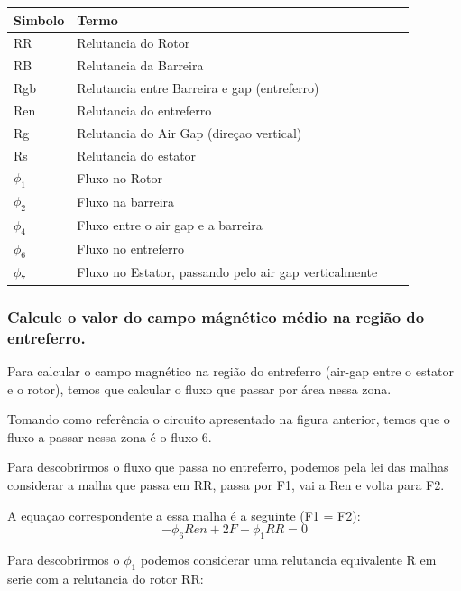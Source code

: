 \documentclass{article}
\begin{document}
\begin{center}
    \begin{tabular}{ | l | l | l | p{5cm} |}
    \hline
    Simbolo & Termo \\ \hline
    RR & Relutancia do Rotor  \\ \hline
    RB & Relutancia da Barreira \\ \hline
    Rgb & Relutancia entre Barreira e gap (entreferro)  \\
    \hline
   Ren & Relutancia do entreferro  \\
    \hline
    Rg & Relutancia do Air Gap (direçao vertical)\\
    \hline
     Rs & Relutancia do estator\\
    \hline
       $\phi_1$ & Fluxo no Rotor\\
    \hline
     $\phi_2$ & Fluxo na barreira\\
    \hline
     $\phi_4$ & Fluxo entre o air gap e a barreira\\
    \hline
     $\phi_6$ & Fluxo no entreferro\\
    \hline
     $\phi_7$ & Fluxo no Estator, passando pelo air gap verticalmente\\
    \hline
    \end{tabular}
\end{center}

\subsubsection{Calcule o valor do campo mágnético médio na região do entreferro.}
Para calcular o campo magnético na região do entreferro (air-gap entre o estator e o rotor), temos que calcular o fluxo que passar por área nessa zona.

Tomando como referência o circuito apresentado na figura anterior, temos que o fluxo a passar nessa zona é o fluxo 6.

Para descobrirmos o fluxo que passa no entreferro, podemos pela lei das malhas considerar a malha que passa em RR, passa por F1, vai a Ren e volta para F2.

A equaçao correspondente a essa malha é a seguinte (F1 = F2):
$$-\phi_6 Ren + 2F - \phi_1 RR = 0$$

Para descobrirmos o $\phi_1$ podemos considerar uma relutancia equivalente R em serie com a relutancia do rotor RR:
\end{document}
